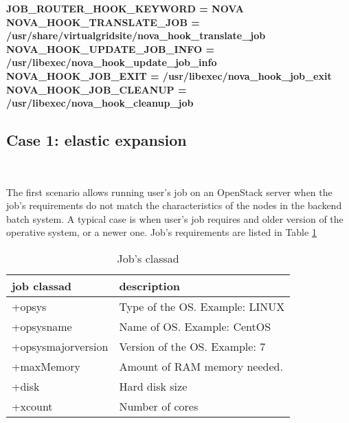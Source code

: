 \documentclass[a4paper]{jpconf}
\begin{document}
\begin{center}
    \colorbox{htcondorbox}{
        \begin{minipage}{\textwidth}
        \small
            \bf{JOB\_ROUTER\_HOOK\_KEYWORD = NOVA \newline \newline
                NOVA\_HOOK\_TRANSLATE\_JOB = /usr/share/virtualgridsite/nova\_hook\_translate\_job \newline
                NOVA\_HOOK\_UPDATE\_JOB\_INFO = /usr/libexec/nova\_hook\_update\_job\_info \newline
                NOVA\_HOOK\_JOB\_EXIT = /usr/libexec/nova\_hook\_job\_exit \newline
                NOVA\_HOOK\_JOB\_CLEANUP = /usr/libexec/nova\_hook\_cleanup\_job
            }
        \end{minipage}
    }
\end{center}



\subsection{Case 1: elastic expansion}

~

The first scenario allows running user's job on an OpenStack server when the job's requirements 
do not match the characteristics of the nodes in the backend batch system. 
A typical case is when user's job requires and older version of the operative system, or a newer one. 
Job's requirements are listed in Table \ref{table:classad1}


\begin{table}[h]
\centering
\begin{tabular}{ l l }
  \hline
  \textbf{job classad} & \textbf{description} \\
  \hline
  +opsys & Type of the OS. Example: LINUX  \\
  +opsysname & Name of OS. Example: CentOS \\
  +opsysmajorversion & Version of the OS. Example: 7 \\
  +maxMemory & Amount of RAM memory needed. \\
  +disk & Hard disk size \\
  +xcount & Number of cores \\
  \hline
\end{tabular}
\caption{Job's classad}
\label{table:classad1}
\end{table}
\end{document}
